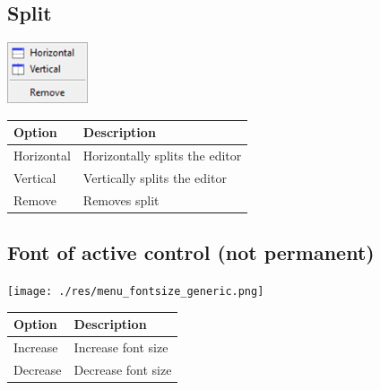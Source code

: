 \hypertarget{menu_view_split}{}
\subsection{Split}

\includegraphics[scale=0.50]{./res/menu_view_split.png}\\

\begin{scriptsize}\begin{tabularx}{\textwidth}{>{\hsize=0.3\hsize}X>{\hsize=0.7\hsize}X}\\
    \hline
    \textbf{Option} & \textbf{Description} \\
    \hline
    Horizontal & Horizontally splits the editor \\
    Vertical & Vertically splits the editor \\
    Remove & Removes split \\
    \hline
  \end{tabularx}\end{scriptsize}


\hypertarget{menu_view_fontsize}{}
\subsection{Font of active control (not permanent)}

\texttt{[image: ./res/menu\_fontsize\_generic.png]}\\

\begin{scriptsize}\begin{tabularx}{\textwidth}{>{\hsize=0.3\hsize}X>{\hsize=0.7\hsize}X}\\
    \hline
    \textbf{Option} & \textbf{Description} \\
    \hline
    Increase & Increase font size \\
    Decrease & Decrease font size \\
    \hline
  \end{tabularx}\end{scriptsize}
